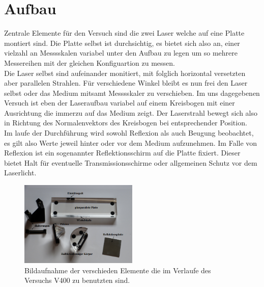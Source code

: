 \section{Aufbau}
Zentrale Elemente für den Versuch sind die zwei Laser welche auf eine Platte montiert sind. Die Platte selbst ist durchsichtig,
es bietet sich also an, einer vielzahl an Messsskalen variabel unter den Aufbau zu legen um so mehrere Messereihen mit der gleichen 
Konfiguartion zu messen. \\
Die Laser selbst sind aufeinander monitiert, mit folglich horizontal versetzten aber parallelen Strahlen. Für verschiedene
Winkel bleibt es nun frei den Laser selbst oder das Medium mitsamt Messsskaler zu verschieben. Im uns dagegebenen Versuch 
ist eben der Laseraufbau variabel auf einem Kreisbogen mit einer Ausrichtung die immerzu auf das Medium zeigt. Der Laserstrahl 
bewegt sich also in Richtung des Normalenvektors des Kreisbogen bei entsprechender Position. \\
Im laufe der Durchführung wird sowohl Reflexion als auch Beugung beobachtet, es gilt also Werte jeweil hinter oder vor dem Medium 
aufzunehmen. Im Falle von Reflexion ist ein sogenannter Reflektionsschirm auf die Platte fixiert. Dieser bietet Halt für eventuelle
Transmissionsschirme oder allgemeinen Schutz vor dem Laserlicht.

\begin{figure}
    \centering
    \includegraphics[width=0.5\textwidth]{bilder/teile.png}
    \caption{Bildaufnahme der verschieden Elemente die im Verlaufe des Versuchs V400 zu benutzten sind. \cite{skript}} 
    \label{fig:figskizze1}
\end{figure}

